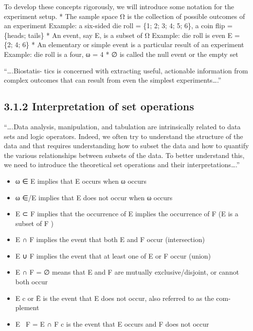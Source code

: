 \documentclass[]{article}
\providecommand{\tightlist}{%
  \setlength{\itemsep}{0pt}\setlength{\parskip}{0pt}}
\begin{document}
To develop these concepts rigorously, we will introduce some notation
for the experiment setup. * The sample space Ω is the collection of
possible outcomes of an experiment Example: a six-sided die roll = \{1;
2; 3; 4; 5; 6\}, a coin flip = \{heads; tails\} * An event, say E, is a
subset of Ω Example: die roll is even E = \{2; 4; 6\} * An elementary or
simple event is a particular result of an experiment Example: die roll
is a four, ω = 4 * ∅ is called the null event or the empty set

``\ldots{}.Biostatis- tics is concerned with extracting useful,
actionable information from complex outcomes that can result from even
the simplest experiments\ldots{}.''

\hypertarget{interpretation-of-set-operations}{%
\subsection{3.1.2 Interpretation of set
operations}\label{interpretation-of-set-operations}}

``\ldots{}.Data analysis, manipulation, and tabulation are intrinsically
related to data sets and logic operators. Indeed, we often try to
understand the structure of the data and that requires understanding how
to subset the data and how to quantify the various relationships between
subsets of the data. To better understand this, we need to introduce the
theoretical set operations and their interpretations\ldots{}.''

\begin{itemize}
\tightlist
\item
  ω ∈ E implies that E occurs when ω occurs
\item
  ω ∈/E implies that E does not occur when ω occurs
\item
  E ⊂ F implies that the occurrence of E implies the occurrence of F (E
  is a subset of F )
\item
  E ∩ F implies the event that both E and F occur (intersection)
\item
  E ∪ F implies the event that at least one of E or F occur (union)
\item
  E ∩ F = ∅ means that E and F are mutually exclusive/disjoint, or
  cannot both occur
\item
  E c or Ē is the event that E does not occur, also referred to as the
  com- plement
\item
  E ~F = E ∩ F c is the event that E occurs and F does not occur
\end{itemize}
\end{document}
